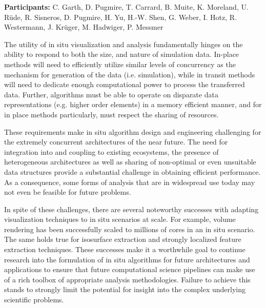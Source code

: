 
\license

\textbf{\sffamily Participants:} C. Garth, D. Pugmire, T. Carrard, B. Muite, K. Moreland, U. Rüde, R. Sisneros, D. Pugmire, H. Yu, H.-W. Shen, G. Weber, I. Hotz, R. Westermann, J. Krüger, M. Hadwiger, P. Messmer

\begin{refsection}

 The utility of in situ visualization and analysis fundamentally hinges on the ability to respond to both the size, and nature of simulation data. In-place methods will need to efficiently utilize similar levels of concurrency as the mechanism for generation of the data (i.e. simulation), while in transit methods will need to dedicate enough computational power to process the transferred data. Further, algorithms must be able to operate on disparate data representations (e.g. higher order elements) in a memory efficient manner, and for in place methods particularly, must respect the sharing of resources.

These requirements make in situ algorithm design and engineering challenging for the extremely concurrent architectures of the near future. The need for integration into and coupling to existing ecosystems, the presence of heterogeneous architectures as well as sharing of non-optimal or even unsuitable data structures provide a substantial challenge in obtaining efficient performance. As a consequence, some forms of analysis that are in widespread use today may not even be feasible for future problems.

In spite of these challenges, there are several noteworthy successes with adapting visualization techniques to in situ scenarios at scale. For example, volume rendering has been successfully scaled to millions of cores in an in situ scenario. The same holds true for isosurface extraction and strongly localized feature extraction techniques. These successes make it a worthwhile goal to continue research into the formulation of in situ algorithms for future architectures and applications to ensure that future computational science pipelines can make use of a rich toolbox of appropriate analysis methodologies. Failure to achieve this stands to strongly limit the potential for insight into the complex underlying scientific problems.


\end{refsection}
